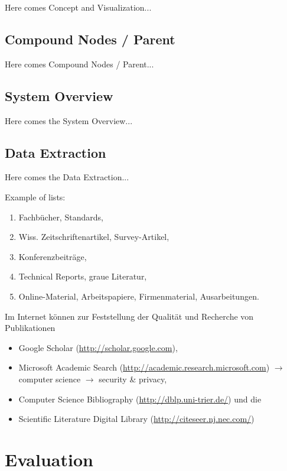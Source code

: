 \documentclass[
    fontsize=12pt,
    headings=small,
    parskip=half,           %
    bibliography=totoc,
    numbers=noenddot,       %
    open=any,               %
    ]{scrreprt}
\begin{document}
Here comes Concept and Visualization...

\section{Compound Nodes / Parent}

Here comes Compound Nodes / Parent...



\section{System Overview}

Here comes the System Overview...

\section{Data Extraction}

Here comes the Data Extraction...

Example of lists:

\begin{enumerate}
	\item Fachbücher, Standards,
	\item Wiss. Zeitschriftenartikel, Survey-Artikel,
	\item Konferenzbeiträge,
	\item Technical Reports, graue Literatur,
	\item Online-Material, Arbeitspapiere, Firmenmaterial, Ausarbeitungen.
\end{enumerate}

Im Internet können zur Feststellung der Qualität und Recherche von Publikationen

\begin{itemize}
	\item Google Scholar (\url{http://scholar.google.com}),
	\item Microsoft Academic Search (\href{http://academic.research.microsoft.com/?SearchDomain=2&SubDomain=2&entitytype=2}{http://academic.research.microsoft.com}) $\to$ computer science $\to$ security \& privacy,
	\item Computer Science Bibliography (\url{http://dblp.uni-trier.de/}) und die
	\item Scientific Literature Digital Library (\url{http://citeseer.nj.nec.com/})
\end{itemize}



\chapter{Evaluation}
\end{document}
